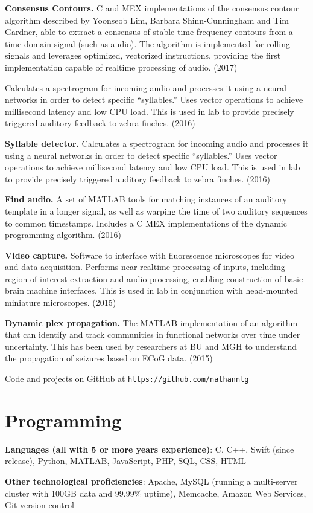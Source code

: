 	\textbf{Consensus Contours.} C and MEX implementations of the consensus contour algorithm described by Yoonseob Lim, Barbara Shinn-Cunningham and Tim Gardner, able to extract a consensus of stable time-frequency contours from a time domain signal (such as audio). The algorithm is implemented for rolling signals and leverages optimized, vectorized instructions, providing the first implementation capable of realtime processing of audio. (2017)
	
	Calculates a spectrogram for incoming audio and processes it using a neural networks in order to detect specific ``syllables.'' Uses vector operations to achieve millisecond latency and low CPU load. This is used in lab to provide precisely triggered auditory feedback to zebra finches. (2016)

	\textbf{Syllable detector.} Calculates a spectrogram for incoming audio and processes it using a neural networks in order to detect specific ``syllables.'' Uses vector operations to achieve millisecond latency and low CPU load. This is used in lab to provide precisely triggered auditory feedback to zebra finches. (2016)
	
	\textbf{Find audio.} A set of MATLAB tools for matching instances of an auditory template in a longer signal, as well as warping the time of two auditory sequences to common timestamps. Includes a C MEX implementations of the dynamic programming algorithm. (2016)
	
	\textbf{Video capture.} Software to interface with fluorescence microscopes for video and data acquisition. Performs near realtime processing of inputs, including region of interest extraction and audio processing, enabling construction of basic brain machine interfaces. This is used in lab in conjunction with head-mounted miniature microscopes. (2015)

	\textbf{Dynamic plex propagation.} The MATLAB implementation of an algorithm that can identify and track communities in functional networks over time under uncertainty. This has been used by researchers at BU and MGH to understand the propagation of seizures based on ECoG data. (2015)
	
	Code and projects on GitHub at \texttt{https://github.com/nathanntg}
	

\section*{Programming} 

	\textbf{Languages (all with 5 or more years experience)}: C, C++, Swift (since release), Python, MATLAB, JavaScript, PHP, SQL, CSS, HTML

	\textbf{Other technological proficiencies}: Apache, MySQL (running a multi-server cluster with 100GB data and 99.99\% uptime), Memcache, Amazon Web Services, Git version control
